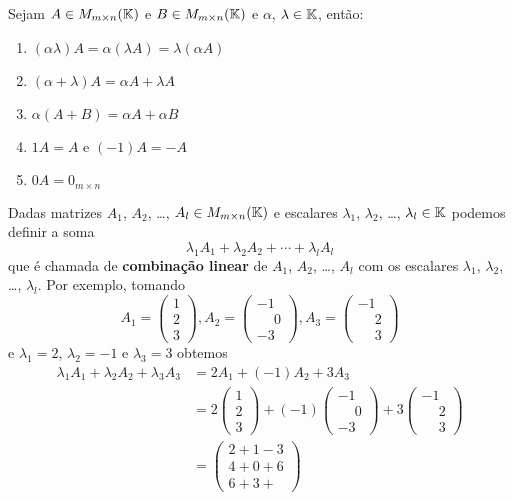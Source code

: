 \begin{proposicao}
    Sejam $A \in M_{m\times n}(\mathbb{K})$ e  $B \in M_{m\times n}(\mathbb{K})$ e $\alpha$, $\lambda \in \mathbb{K}$, ent\~ao:
	\begin{enumerate}[label={\roman*})]
		\item $(\alpha\lambda) A = \alpha(\lambda A) = \lambda(\alpha A)$
		\item $(\alpha + \lambda)A = \alpha A + \lambda A$
        \item $\alpha(A + B) = \alpha A + \alpha B$
        \item $1A = A$ e $(-1)A = -A$
        \item  $0A = 0_{m \times n}$
	\end{enumerate}
\end{proposicao}

\begin{observacao}
    Dadas matrizes $A_1$, $A_2$, \dots, $A_l \in M_{m \times n}(\mathbb{K})$ e escalares $\lambda_1$, $\lambda_2$, \dots, $\lambda_l \in \mathbb{K}$
    podemos definir a soma
    \[
        \lambda_1 A_1 + \lambda_2 A_2 + \cdots + \lambda_l A_l
    \]
    que é chamada de \textbf{combinação linear} de $A_1$, $A_2$, \dots, $A_l$ com os escalares $\lambda_1$, $\lambda_2$, \dots, $\lambda_l$. Por exemplo, tomando
    \[
        A_1 = \begin{pmatrix}1\\2\\3\end{pmatrix}, A_2 = \begin{pmatrix}-1\\\phantom{-}0\\-3\end{pmatrix}, A_3 = \begin{pmatrix}-1\\\phantom{-}2\\\phantom{-}3\end{pmatrix}
    \]
    e $\lambda_1 = 2$, $\lambda_2 = -1$ e $\lambda_3 = 3$ obtemos
    \begin{align*}
        \lambda_1 A_1 + \lambda_2 A_2 + \lambda_3 A_3 &= 2A_1 + (-1)A_2 + 3A_3\\ &= 2\begin{pmatrix}1\\2\\3\end{pmatrix} + (-1)
        \begin{pmatrix}-1\\\phantom{-}0\\-3\end{pmatrix} +3\begin{pmatrix}-1\\\phantom{-}2\\\phantom{-}3\end{pmatrix}\\ &= \begin{pmatrix}2 + 1 - 3\\4 + 0 + 6\\6 + 3 +

\end{pmatrix}
\end{align*}
\end{observacao}
